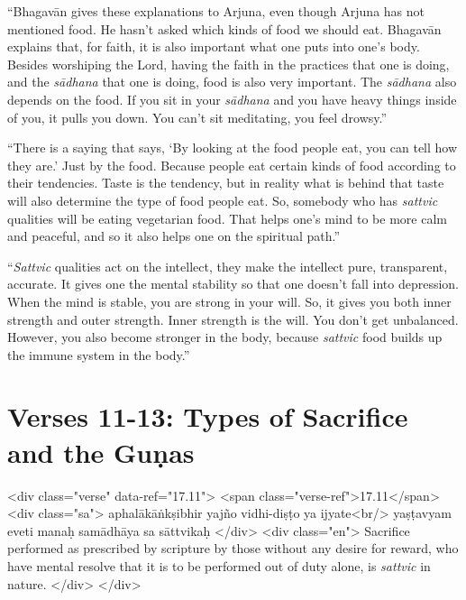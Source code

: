 \enquote{Bhagavān gives these explanations to Arjuna, even though Arjuna has not mentioned food. He hasn’t asked which kinds of food we should eat. Bhagavān explains that, for faith, it is also important what one puts into one’s body. Besides worshiping the Lord, having the faith in the practices that one is doing, and the \textit{sādhana} that one is doing, food is also very important. The \textit{sādhana} also depends on the food. If you sit in your \textit{sādhana} and you have heavy things inside of you, it pulls you down. You can’t sit meditating, you feel drowsy.}

\enquote{There is a saying that says, \enquote{By looking at the food people eat, you can tell how they are.} Just by the food. Because people eat certain kinds of food according to their tendencies. Taste is the tendency, but in reality what is behind that taste will also determine the type of food people eat. So, somebody who has \textit{sattvic} qualities will be eating vegetarian food. That helps one’s mind to be more calm and peaceful, and so it also helps one on the spiritual path.}

\enquote{\textit{Sattvic} qualities act on the intellect, they make the intellect pure, transparent, accurate. It gives one the mental stability so that one doesn’t fall into depression. When the mind is stable, you are strong in your will. So, it gives you both inner strength and outer strength. Inner strength is the will. You don’t get unbalanced. However, you also become stronger in the body, because \textit{sattvic} food builds up the immune system in the body.}

\section{Verses 11-13: Types of Sacrifice and the Guṇas}\label{sec-verses-11-13-types-of-sacrifice-and-the-gunas}


\begin{html}
<div class="verse" data-ref="17.11">
  <span class="verse-ref">17.11</span>
  <div class="sa">
    aphalākāṅkṣibhir yajño vidhi-diṣṭo ya ijyate<br/>
    yaṣṭavyam eveti manaḥ samādhāya sa sāttvikaḥ
  </div>
  <div class="en">
    Sacrifice performed as prescribed by scripture by those without any desire for reward, who have mental resolve that it is to be performed out of duty alone, is \textit{sattvic} in nature.
  </div>
</div>
\end{html}





